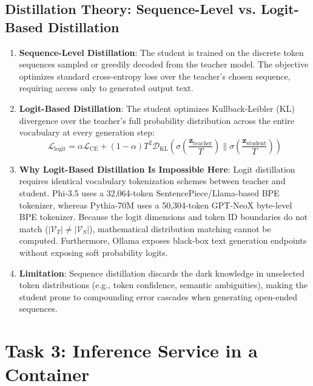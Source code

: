 \documentclass[10pt,a4paper]{article}
\begin{document}
\subsection{Distillation Theory: Sequence-Level vs. Logit-Based Distillation}
\begin{enumerate}\setlength\itemsep{0em}
    \item \textbf{Sequence-Level Distillation}: The student is trained on the discrete token sequences sampled or greedily decoded from the teacher model. The objective optimizes standard cross-entropy loss over the teacher's chosen sequence, requiring access only to generated output text.
    \item \textbf{Logit-Based Distillation}: The student optimizes Kullback-Leibler (KL) divergence over the teacher's full probability distribution across the entire vocabulary at every generation step:
    \begin{equation}
        \mathcal{L}_{\text{logit}} = \alpha \mathcal{L}_{\text{CE}} + (1 - \alpha) T^2 \mathcal{D}_{\text{KL}}\left(\sigma\left(\frac{\mathbf{z}_{\text{teacher}}}{T}\right) \parallel \sigma\left(\frac{\mathbf{z}_{\text{student}}}{T}\right)\right)
    \end{equation}
    \item \textbf{Why Logit-Based Distillation Is Impossible Here}: Logit distillation requires identical vocabulary tokenization schemes between teacher and student. Phi-3.5 uses a 32,064-token SentencePiece/Llama-based BPE tokenizer, whereas Pythia-70M uses a 50,304-token GPT-NeoX byte-level BPE tokenizer. Because the logit dimensions and token ID boundaries do not match ($|\mathcal{V}_T| \neq |\mathcal{V}_S|$), mathematical distribution matching cannot be computed. Furthermore, Ollama exposes black-box text generation endpoints without exposing soft probability logits.
    \item \textbf{Limitation}: Sequence distillation discards the dark knowledge in unselected token distributions (e.g., token confidence, semantic ambiguities), making the student prone to compounding error cascades when generating open-ended sequences.
\end{enumerate}

\section{Task 3: Inference Service in a Container}
\end{document}
